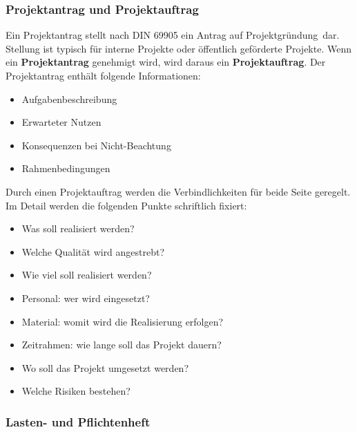\subsubsection{Projektantrag und Projektauftrag}

Ein Projektantrag stellt nach DIN 69905 ein \ql Antrag auf Projektgründung\qr\ dar. Stellung ist typisch für interne Projekte oder öffentlich geförderte Projekte. Wenn ein \textbf{Projektantrag} genehmigt wird, wird daraus ein \textbf{Projektauftrag}. Der Projektantrag enthält folgende Informationen:
\begin{itemize}
	\item Aufgabenbeschreibung
	\item Erwarteter Nutzen
	\item Konsequenzen bei Nicht-Beachtung
	\item Rahmenbedingungen
\end{itemize}
\noindent Durch einen Projektauftrag werden die Verbindlichkeiten für beide Seite geregelt. Im Detail werden die folgenden Punkte schriftlich fixiert:
\begin{itemize}
	\item Was soll realisiert werden?
	\item Welche Qualität wird angestrebt?
	\item Wie viel soll realisiert werden?
	\item Personal: wer wird eingesetzt?
	\item Material: womit wird die Realisierung erfolgen?
	\item Zeitrahmen: wie lange soll das Projekt dauern?
	\item Wo soll das Projekt umgesetzt werden?
	\item Welche Risiken bestehen?
\end{itemize}

\subsubsection{Lasten- und Pflichtenheft}

